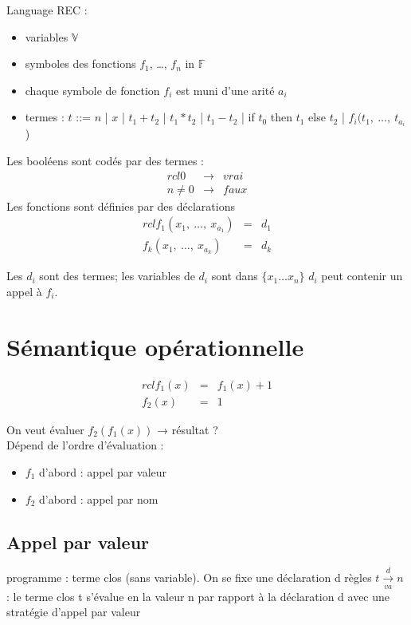 \documentclass[10pt,a4paper]{article}
\newcommand{\Vs}{\mathbb{V}}
\newcommand{\Fs}{\mathbb{F}}
\begin{document}
Language REC :
\begin{itemize}
 \item variables $\Vs$
 \item symboles des fonctions $f_1$, \dots, $f_n$ in $\Fs$
 \item chaque symbole de fonction $f_i$ est muni d'une arité $a_i$
 \item termes : $t$ ::= $n$ | $x$ | $t_1 + t_2$ | $t_1 * t_2$ | $t_1 - t_2$ | if $t_0$ then $t_1$ else $t_2$ | $f_i(t_1,\ \dots,\ t_{a_i}$)
\end{itemize}
Les booléens sont codés par des termes :  \begin{eqnarray}{rcl}
                                           0 & \to & vrai\\
					   n \neq 0 & \to & faux
                                          \end{eqnarray}
Les fonctions sont définies par des déclarations 
\begin{eqnarray}{rcl}
 f_1(x_1,\ \dots,\ x_{a_1}) & = & d_1\\
 f_k(x_1,\ \dots,\ x_{a_k}) & = & d_k
\end{eqnarray}


Les $d_i$ sont des termes; les variables de $d_i$ sont dans $\{ x_1 \dots x_n \}$
$d_i$ peut contenir un appel à $f_i$.

\section{Sémantique opérationnelle}

\begin{ex}
\begin{eqnarray}{rcl}
  f_1(x) & = & f_1(x) +1\\
  f_2(x) & = & 1
\end{eqnarray}

On veut évaluer $f_2(f_1(x))$ → résultat ?\\
Dépend de l'ordre d'évaluation : \begin{itemize}
                                  \item $f_1$ d'abord : appel par valeur
                                  \item $f_2$ d'abord : appel par nom
                                 \end{itemize}
\end{ex}

\subsection{Appel par valeur}
programme : terme clos (sans variable). On se fixe une déclaration d
règles $t \xrightarrow[va]{d} n$ : \og le terme clos t s'évalue en la valeur n par rapport à la déclaration d avec une stratégie d'appel par valeur \fg
\end{document}
